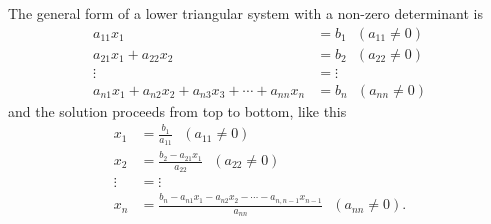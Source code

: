 \documentclass[letterpaper]{book}
\begin{document}
The general form of a lower triangular system with a non-zero determinant is
\begin{equation}
    \begin{aligned}
         a_{11} x_1 &= b_1  ~~~(a_{11} \neq 0) \\
          a_{21} x_1 + a_{22} x_2 &=b_2 ~~~(a_{22} \neq 0)\\
     \vdots &= \vdots \\
          a_{n1} x_1 + a_{n2} x_2 + a_{n3} x_3+ \cdots +  a_{nn} x_n &=b_n ~~~(a_{nn} \neq 0)
    \end{aligned}
\end{equation}
and the solution proceeds from top to bottom, like this
\begin{equation}
    \begin{aligned}
         x_1 &= \frac{b_1}{a_{11}}  ~~~(a_{11} \neq 0) \\
           x_2 &= \frac{b_2- a_{21} x_1}{a_{22}} ~~~(a_{22} \neq 0)\\
     \vdots &= \vdots \\
          x_n &=\frac{b_n-a_{n1} x_1 - a_{n2} x_2 - \cdots  -a_{n,n-1} x_{n-1}}{a_{nn}}    ~~~(a_{nn} \neq 0).
    \end{aligned}
\end{equation}
\end{document}
